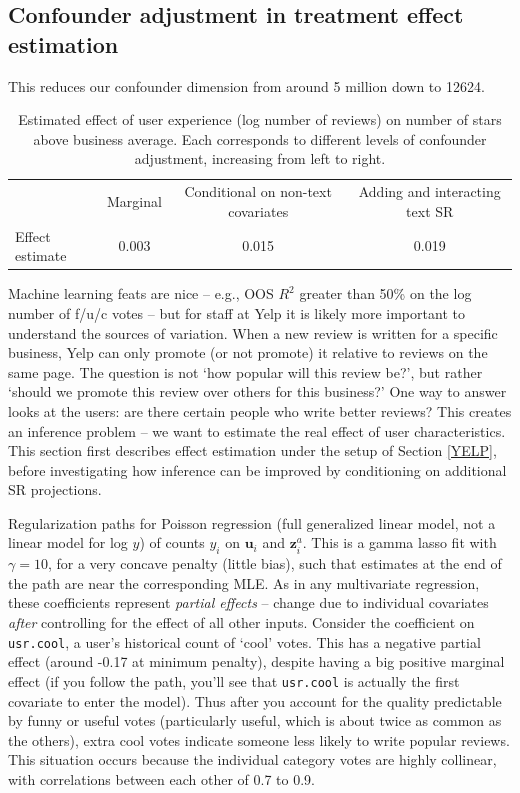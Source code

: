 \documentclass[12pt]{article}
\newcommand{\bm}[1]{\mathbf{#1}}
\newcommand{\cd}[1]{{\tt#1}}
\begin{document}
\subsection{Confounder adjustment in treatment effect estimation}

This reduces our confounder dimension from around 5 million down to 12624.

\begin{table}\small
\begin{tabular}{l|ccc}
& Marginal & Conditional on non-text covariates & Adding and interacting text SR \\
\cline{2-4}
Effect estimate & 0.003 & 0.015 & 0.019
\end{tabular}
\caption{Estimated effect of user experience (log number of reviews) on number of stars above business average.  Each corresponds to different levels of confounder adjustment, increasing from left to right.}
\end{table}



Machine learning feats are nice -- e.g., OOS $R^2$ greater than 50\% on the
log number of f/u/c votes -- but for staff at Yelp it is likely more important
to understand the sources of variation.  When a new review is written for a
specific business, Yelp can only promote (or not promote) it relative to
reviews on the same page.  The question is not `how popular will this review
be?', but rather `should we promote this review over others for this
business?'  One way to answer looks at the users: are there certain people who
write better reviews?  This creates an inference problem -- we want to
estimate the real effect of user characteristics. This section first describes
effect estimation under the setup of Section \ref{YELP}, before investigating how
inference can be improved by conditioning on additional SR projections.

Regularization paths for
Poisson regression (full generalized linear model, not a linear model for
log $y$) of  counts $y_i$ on   $\bm{u}_i$ and
$\bm{z}^a_i$.  This is a gamma lasso fit with $\gamma =10$, for a very concave
penalty (little bias), such that estimates at the end of the path
are near the corresponding MLE.  As in any multivariate regression, these coefficients
represent {\it partial effects} --  change due to
 individual covariates {\it after} controlling for the effect of all other
inputs.  Consider the coefficient on \cd{usr.cool}, a user's historical
count of `cool' votes.  This has a negative partial effect (around -0.17 at
minimum penalty), despite having a big positive marginal effect (if you follow
the path, you'll see that \cd{usr.cool} is actually the first covariate to
enter the model).  Thus after you account for the quality
predictable by funny or useful votes (particularly useful, which is about
twice as common as the others), extra cool votes indicate someone less likely
to write popular reviews.  This situation occurs because the individual
category votes are highly collinear, with correlations between each other of
0.7 to 0.9.
\end{document}
